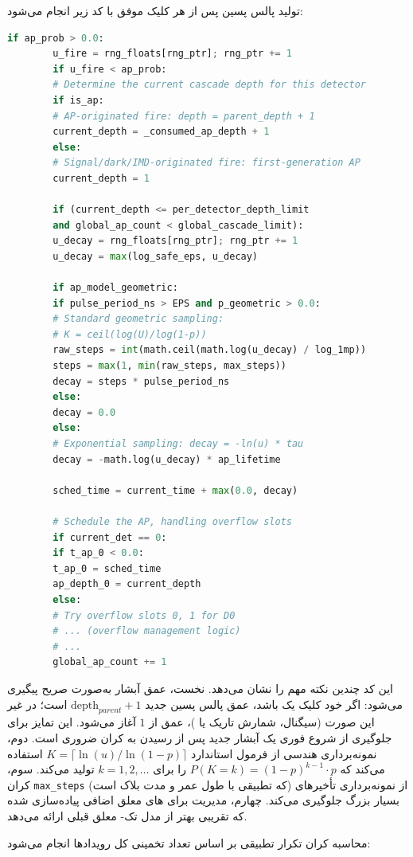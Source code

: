 تولید پالس پسین پس از هر کلیک موفق با کد زیر انجام می‌شود:

\begin{LTR}
	\begin{lstlisting}[language=Python]
		if ap_prob > 0.0:
		u_fire = rng_floats[rng_ptr]; rng_ptr += 1
		if u_fire < ap_prob:
		# Determine the current cascade depth for this detector
		if is_ap:
		# AP-originated fire: depth = parent_depth + 1
		current_depth = _consumed_ap_depth + 1
		else:
		# Signal/dark/IMD-originated fire: first-generation AP
		current_depth = 1
		
		if (current_depth <= per_detector_depth_limit
		and global_ap_count < global_cascade_limit):
		u_decay = rng_floats[rng_ptr]; rng_ptr += 1
		u_decay = max(log_safe_eps, u_decay)
		
		if ap_model_geometric:
		if pulse_period_ns > EPS and p_geometric > 0.0:
		# Standard geometric sampling:
		# K = ceil(log(U)/log(1-p))
		raw_steps = int(math.ceil(math.log(u_decay) / log_1mp))
		steps = max(1, min(raw_steps, max_steps))
		decay = steps * pulse_period_ns
		else:
		decay = 0.0
		else:
		# Exponential sampling: decay = -ln(u) * tau
		decay = -math.log(u_decay) * ap_lifetime
		
		sched_time = current_time + max(0.0, decay)
		
		# Schedule the AP, handling overflow slots
		if current_det == 0:
		if t_ap_0 < 0.0:
		t_ap_0 = sched_time
		ap_depth_0 = current_depth
		else:
		# Try overflow slots 0, 1 for D0
		# ... (overflow management logic)
		# ...
		global_ap_count += 1
	\end{lstlisting}
\end{LTR}

این کد چندین نکته مهم را نشان می‌دهد. نخست، عمق آبشار به‌صورت صریح پیگیری می‌شود: اگر خود کلیک یک  باشد، عمق پالس پسین جدید $\text{depth}_{parent} + 1$ است؛ در غیر این صورت (سیگنال، شمارش تاریک یا )، عمق از $1$ آغاز می‌شود. این تمایز برای جلوگیری از شروع فوری یک آبشار جدید پس از رسیدن به کران ضروری است. دوم، نمونه‌برداری هندسی از فرمول استاندارد $K = \lceil \ln(u)/\ln(1-p) \rceil$ استفاده می‌کند که $P(K = k) = (1-p)^{k-1} \cdot p$ را برای $k = 1, 2, \ldots$ تولید می‌کند. سوم، کران \texttt{max\_steps} (که تطبیقی با طول عمر و مدت بلاک است) از نمونه‌برداری تأخیرهای بسیار بزرگ جلوگیری می‌کند. چهارم، مدیریت  برای های معلق اضافی پیاده‌سازی شده که تقریبی بهتر از مدل تک- معلق قبلی ارائه می‌دهد.

محاسبه کران تکرار تطبیقی  بر اساس تعداد تخمینی کل رویدادها انجام می‌شود:

